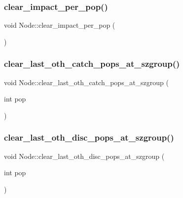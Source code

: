 \subsubsection{\texorpdfstring{clear\_impact\_per\_pop()}{clear\_impact\_per\_pop()}}
{\footnotesize\ttfamily void Node\+::clear\+\_\+impact\+\_\+per\+\_\+pop (\begin{DoxyParamCaption}{ }\end{DoxyParamCaption})}

\mbox{\label{class_node_a2a6d73539ecc797ccc79e9b21a9fa7aa}} 
\subsubsection{\texorpdfstring{clear\_last\_oth\_catch\_pops\_at\_szgroup()}{clear\_last\_oth\_catch\_pops\_at\_szgroup()}}
{\footnotesize\ttfamily void Node\+::clear\+\_\+last\+\_\+oth\+\_\+catch\+\_\+pops\+\_\+at\+\_\+szgroup (\begin{DoxyParamCaption}\item[{int}]{pop }\end{DoxyParamCaption})}

\mbox{\label{class_node_ae483cf5af866e2fc9764e7532cfc0317}} 
\subsubsection{\texorpdfstring{clear\_last\_oth\_disc\_pops\_at\_szgroup()}{clear\_last\_oth\_disc\_pops\_at\_szgroup()}}
{\footnotesize\ttfamily void Node\+::clear\+\_\+last\+\_\+oth\+\_\+disc\+\_\+pops\+\_\+at\+\_\+szgroup (\begin{DoxyParamCaption}\item[{int}]{pop }\end{DoxyParamCaption})}

\mbox{\label{class_node_ae16a529dbbfd29982b6f4c57d50c5836}} 
